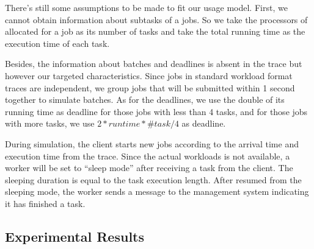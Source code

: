 There's still some assumptions to be made to fit our usage model.
First, we cannot obtain information about subtasks of a jobs.
So we take the processors of allocated for a job as its number of tasks
and take the total running time as the execution time of each task.

Besides, the information about batches and deadlines is absent in the
trace but however our targeted characteristics.
Since jobs in standard workload format traces are independent,
we group jobs that will be submitted within 1 second together to
simulate batches.
As for the deadlines, we use the double of its running time as deadline
for those jobs with less than 4 tasks, and for those jobs with more
tasks, we use $2 * runtime * \#task / 4$ as deadline.

During simulation, the client starts new jobs according to the arrival
time and execution time from the trace.
Since the actual workloads is not available, a worker will be set to
``sleep mode'' after receiving a task from the client.
The sleeping duration is equal to the task execution length.
After resumed from the sleeping mode, the worker sends a message to the
management system indicating it has finished a task.


\subsection{Experimental Results}



